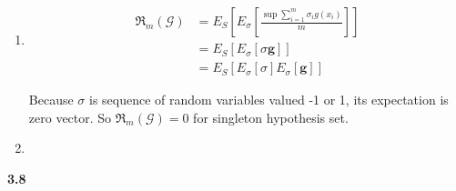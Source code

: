 \documentclass[12pt]{article}
\begin{document}
\begin{enumerate}[label=(\alph*), left=0pt] 
    \item 
    \begin{align*}
        \mathfrak{R}_{m}(\mathcal{G}) &= E_{S}[E_{\sigma}[\frac{\sup \sum \limits_{i=1}^{m} 
            \sigma_{i} g(x_{i})}{m}]] \\
        &= E_{S}[E_{\sigma}[\sigma \mathbf{g}]] \\
        &= E_{S}[E_{\sigma}[\sigma] E_{\sigma} [\mathbf{g}]]
    \end{align*}

    Because $\sigma$ is sequence of random variables valued -1 or 1, its expectation is zero
    vector. So $\mathfrak{R}_{m}(\mathcal{G}) = 0$ for singleton hypothesis set.

    \item

\end{enumerate}

\vspace{1em}  %

\noindent \textbf{3.8}
\end{document}
